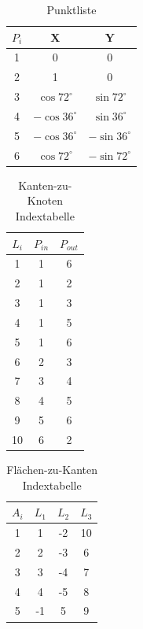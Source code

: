 \documentclass[Protokollheft.tex]{subfiles}
\begin{document}
\begin{table}[h!]
	\begin{center}
	
	\label{tab:table1}
	\begin{tabular}{c|c|c} %
		$P_i$ & X & Y\\
		\hline
		1 & 0 & 0\\
		2 & 1 & 0\\
		3 & $\cos 72^\circ$ &$\sin 72^\circ$ \\
		4 & $-\cos 36^\circ$ &$\sin 36^\circ$ \\
		5 & $-\cos 36^\circ$ &$-\sin 36^\circ$ \\
		6 & $\cos 72^\circ$ &$-\sin 72^\circ$ \\
	\end{tabular}
	\end{center}
\caption{Punktliste}

\end{table}
\begin{table}[h!]
	\begin{center}
	
		
		\begin{tabular}{c|c|c} %
			$L_i$ & $P_{in}$ & $P_{out}$\\
			\hline
			1 & 1 & 6\\
			2 & 1 & 2\\
			3 & 1 & 3\\
			4 & 1 & 5\\
			5 & 1 & 6\\
			6 & 2 & 3\\
			7 & 3 & 4\\
			8 & 4 & 5\\
			9 & 5 & 6\\
			10 & 6 & 2\\  
		\end{tabular}
			\end{center}
		\caption{Kanten-zu-Knoten Indextabelle}
	\label{tab:table2}
\end{table}

\begin{table}[h!]
\begin{center}
	

	\begin{tabular}{c|c|c|c} %
		$A_i$ & $L_{1}$ & $L_{2}$ & $L_{3}$\\
		\hline
		1 & 1 & -2 & 10\\
		2 & 2 & -3 & 6\\
		3 & 3 & -4 & 7\\
		4 & 4 & -5 & 8\\
		5 & -1 & 5 & 9\\
	\end{tabular}
\end{center}
\caption{Flächen-zu-Kanten Indextabelle}
	\label{tab:table3}
\end{table}
\end{document}
